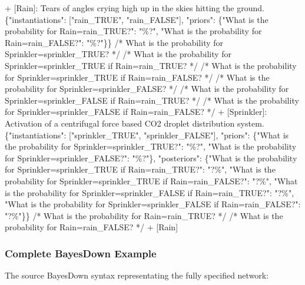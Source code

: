 \documentclass[
  11pt,
  letterpaper,
]{book}
\newenvironment{Shaded}{\begin{snugshade}}{\end{snugshade}}
\newcommand{\InformationTok}[1]{\textcolor[rgb]{0.37,0.37,0.37}{#1}}
\begin{document}
\begin{landscape}
\begin{Shaded}
\begin{Highlighting}[]
\InformationTok{        + [Rain]: Tears of angles crying high up in the skies hitting the ground. \{"instantiations": ["rain\_TRUE", "rain\_FALSE"], "priors": \{"What is the probability for Rain=rain\_TRUE?": "\%?", "What is the probability for Rain=rain\_FALSE?": "\%?"\}\}}
\InformationTok{        /* What is the probability for Sprinkler=sprinkler\_TRUE? */}
\InformationTok{        /* What is the probability for Sprinkler=sprinkler\_TRUE if Rain=rain\_TRUE? */}
\InformationTok{        /* What is the probability for Sprinkler=sprinkler\_TRUE if Rain=rain\_FALSE? */}
\InformationTok{        /* What is the probability for Sprinkler=sprinkler\_FALSE? */}
\InformationTok{        /* What is the probability for Sprinkler=sprinkler\_FALSE if Rain=rain\_TRUE? */}
\InformationTok{        /* What is the probability for Sprinkler=sprinkler\_FALSE if Rain=rain\_FALSE? */}
\InformationTok{        + [Sprinkler]: Activation of a centrifugal force based CO2 droplet distribution system. \{"instantiations": ["sprinkler\_TRUE", "sprinkler\_FALSE"], "priors": \{"What is the probability for Sprinkler=sprinkler\_TRUE?": "\%?", "What is the probability for Sprinkler=sprinkler\_FALSE?": "\%?"\}, "posteriors": \{"What is the probability for Sprinkler=sprinkler\_TRUE if Rain=rain\_TRUE?": "?\%", "What is the probability for Sprinkler=sprinkler\_TRUE if Rain=rain\_FALSE?": "?\%", "What is the probability for Sprinkler=sprinkler\_FALSE if Rain=rain\_TRUE?": "?\%", "What is the probability for Sprinkler=sprinkler\_FALSE if Rain=rain\_FALSE?": "?\%"\}\}}
\InformationTok{            /* What is the probability for Rain=rain\_TRUE? */}
\InformationTok{            /* What is the probability for Rain=rain\_FALSE? */}
\InformationTok{            + [Rain]}
\end{Highlighting}
\end{Shaded}

\subsubsection*{Complete BayesDown
Example}\label{complete-bayesdown-example}

The source BayesDown syntax representating the fully specified network:


\end{landscape}
\end{document}
